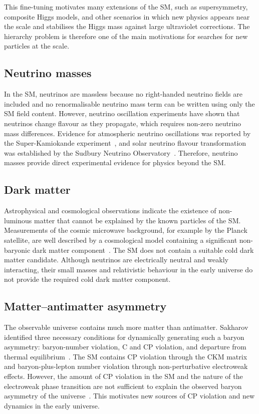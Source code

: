 This fine-tuning motivates many extensions of the SM, such as supersymmetry, composite Higgs models, and other scenarios in which new physics appears near the \TeV{} scale and stabilises the Higgs mass against large ultraviolet corrections. 
The hierarchy problem is therefore one of the main motivations for searches for new particles at the \TeV{} scale. 


\subsection{Neutrino masses}
\label{subsec:neutrino_masses}

In the SM, neutrinos are massless because no right-handed neutrino fields are included and no renormalisable neutrino mass term can be written using only the SM field content. 
However, neutrino oscillation experiments have shown that neutrinos change flavour as they propagate, which requires non-zero neutrino mass differences. 
Evidence for atmospheric neutrino oscillations was reported by the Super-Kamiokande experiment~\cite{SuperK1998}, and solar neutrino flavour transformation was established by the Sudbury Neutrino Observatory~\cite{SNO2002}. 
Therefore, neutrino masses provide direct experimental evidence for physics beyond the SM.

\subsection{Dark matter}
\label{subsec:dark_matter}

Astrophysical and cosmological observations indicate the existence of non-luminous matter that cannot be explained by the known particles of the SM. 
Measurements of the cosmic microwave background, for example by the Planck satellite, are well described by a cosmological model containing a significant non-baryonic dark matter component~\cite{Planck2018}. 
The SM does not contain a suitable cold dark matter candidate. 
Although neutrinos are electrically neutral and weakly interacting, their small masses and relativistic behaviour in the early universe do not provide the required cold dark matter component.

\subsection{Matter--antimatter asymmetry}
\label{subsec:baryon_asymmetry}

The observable universe contains much more matter than antimatter. 
Sakharov identified three necessary conditions for dynamically generating such a baryon asymmetry: baryon-number violation, C and CP violation, and departure from thermal equilibrium~\cite{Sakharov1967}. 
The SM contains CP violation through the CKM matrix and baryon-plus-lepton number violation through non-perturbative electroweak effects. 
However, the amount of CP violation in the SM and the nature of the electroweak phase transition are not sufficient to explain the observed baryon asymmetry of the universe~\cite{Gavela1994,Cohen1993}. 
This motivates new sources of CP violation and new dynamics in the early universe.

